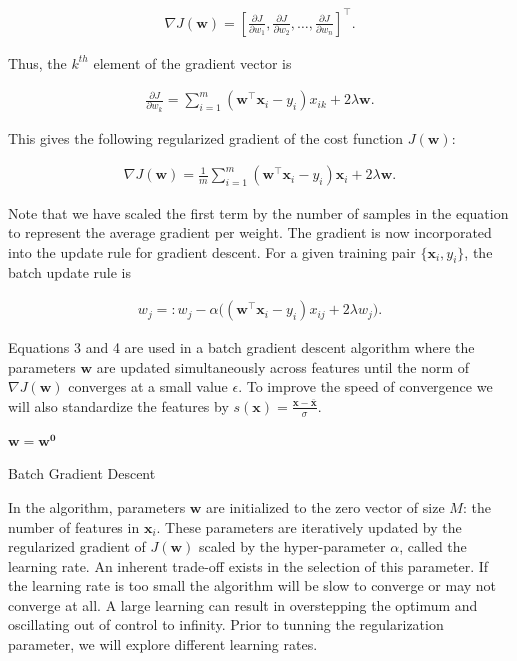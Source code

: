 \documentclass{article}
\renewcommand{\vec}[1]{\mathbf{#1}}
\begin{document}
\begin{align}
	\nabla J(\vec{w}) = \left[\frac{\partial J}{\partial w_1}, \frac{\partial J}{\partial w_2},\dots, \frac{\partial J}{\partial w_n}\right]^\top .
\end{align}

Thus, the $k^{th}$ element of the gradient vector is 

\begin{align}
\frac{\partial J}{\partial w_k} = \sum^{m}_{i=1}(\vec{w}^\top\vec{x}_i - y_i)x_{ik} + 2\lambda\vec{w}.
\end{align}


This gives the following regularized gradient of the cost function $J(\vec{w})$:

\begin{align}
	\nabla J(\vec{w}) = \frac{1}{m} \sum^{m}_{i=1}(\vec{w}^\top\vec{x}_i - y_i)\vec{x}_i + 2\lambda\vec{w}.
\end{align}

Note that we have scaled the first term by the number of samples in the equation to represent the average gradient per weight. The gradient is now incorporated into the update rule for gradient descent. For a given training pair $\{\vec{x}_i, y_i\}$, the batch update rule is

\begin{align}
w_j =: w_j - \alpha\big((\vec{w}^\top \vec{x}_i - y_i)x_{ij} + 2\lambda w_j\big).
\end{align}

Equations 3 and 4 are used in a batch gradient descent algorithm where the parameters $\vec{w}$ are updated simultaneously across features until the norm of $\nabla J(\vec{w})$ converges at a small value $\epsilon$. To improve the speed of convergence we will also standardize the features by $s(\vec{x}) = \frac{\vec{x} - \bar{\vec{x}}}{\sigma}$.

\vspace{3mm}

\begin{algorithm}[H]
	\SetAlgoLined
	$\vec{w} = \vec{w}^{\vec{0}}$\;
	\Do{$|\nabla J(\vec{w})| \ge \epsilon$}{
		$\nabla J(\vec{w}) = \frac{1}{m} \sum^{m}_{i=1}(\vec{w}^\top\vec{x}_i - y_i)\vec{x}_i + 2\lambda\vec{w}$\;
		$\vec{w} =: \vec{w} - \alpha\nabla J(\vec{w})$\;
	}
	\caption{Batch Gradient Descent}
\end{algorithm}

\vspace{3mm}

In the algorithm, parameters $\vec{w}$ are initialized to the zero vector of size $M$: the number of features in $\vec{x}_i$. These parameters are iteratively updated by the regularized gradient of $J(\vec{w})$ scaled by the hyper-parameter $\alpha$, called the learning rate. An inherent trade-off exists in the selection of this parameter. If the learning rate is too small the algorithm will be slow to converge or may not converge at all. A large learning can result in overstepping the optimum and oscillating out of control to infinity. Prior to tunning the regularization parameter, we will explore different learning rates.
\end{document}
